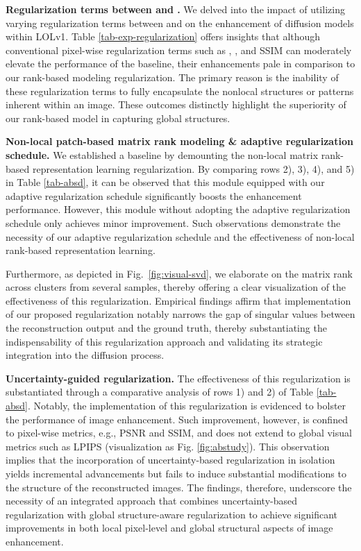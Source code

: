 \documentclass{article}
\begin{document}
\textbf{Regularization terms between  and .}
We delved into the impact of utilizing varying regularization terms between  and  on the enhancement of diffusion models within LOLv1. Table \ref{tab-exp-regularization} offers insights that although conventional pixel-wise regularization terms such as , , and SSIM can moderately elevate the performance of the baseline, their enhancements pale in comparison to our rank-based modeling regularization. The primary reason is the inability of these regularization terms to fully encapsulate the nonlocal structures or patterns inherent within an image. These outcomes distinctly highlight the superiority of our rank-based model in capturing global structures.



\textbf{Non-local patch-based matrix rank modeling \& adaptive regularization schedule.}
We established a baseline by demounting the non-local matrix rank-based representation learning regularization. By comparing rows 2), 3), 4), and 5) in Table \ref{tab-absd}, it can be observed that this module equipped with our adaptive regularization schedule significantly boosts the enhancement performance. However, this module without adopting the adaptive regularization schedule only achieves minor improvement. Such observations demonstrate the necessity of our adaptive regularization schedule and the effectiveness of non-local rank-based representation learning.

Furthermore, as depicted in Fig.~\ref{fig:visual-svd}, we elaborate on the matrix rank across clusters from several samples, thereby offering a clear visualization of the effectiveness of this regularization. Empirical findings affirm that implementation of our proposed regularization notably narrows the gap of singular values between the reconstruction output and the ground truth, thereby substantiating the indispensability of this regularization approach and validating its strategic integration into the diffusion process.

\textbf{Uncertainty-guided regularization.}
The effectiveness of this regularization is substantiated through a comparative analysis of rows 1) and 2) of Table \ref{tab-absd}. Notably, the implementation of this regularization is evidenced to bolster the performance of image enhancement. Such improvement, however, is confined to pixel-wise metrics, e.g., PSNR and SSIM, and does not extend to global visual metrics such as LPIPS (visualization as Fig. \ref{fig:abstudy}). This observation implies that the incorporation of uncertainty-based regularization in isolation yields incremental advancements but fails to induce substantial modifications to the structure of the reconstructed images. The findings, therefore, underscore the necessity of an integrated approach that combines uncertainty-based regularization with global structure-aware regularization to achieve significant improvements in both local pixel-level and global structural aspects of image enhancement.
\end{document}
